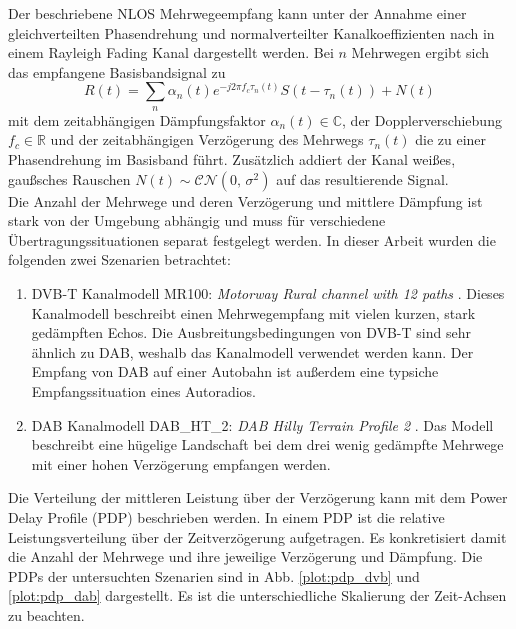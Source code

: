 Der beschriebene NLOS Mehrwegeempfang kann unter der Annahme einer gleichverteilten Phasendrehung und normalverteilter Kanalkoeffizienten nach \cite{proakis} in einem Rayleigh Fading Kanal dargestellt werden.
Bei $n$ Mehrwegen ergibt sich das empfangene Basisbandsignal zu
\begin{equation}
R(t) = \sum \limits_n \alpha_n(t) e^{-j2\pi f_c \tau_n(t)} S(t-\tau_n(t)) + N(t)
\end{equation}
mit dem zeitabhängigen Dämpfungsfaktor $\alpha_n(t) \in \mathbb{C}$, der Dopplerverschiebung $f_c \in \mathbb{R}$ und der zeitabhängigen Verzögerung des Mehrwegs $\tau_n(t)$ die zu einer Phasendrehung im Basisband führt. Zusätzlich addiert der Kanal weißes, gaußsches Rauschen $N(t) \sim \mathcal{C}\mathcal{N}(0,\,\sigma^{2})$ auf das resultierende Signal.\\  
Die Anzahl der Mehrwege und deren Verzögerung und mittlere Dämpfung ist stark von der Umgebung abhängig und muss für verschiedene Übertragungssituationen separat festgelegt werden.
In dieser Arbeit wurden die folgenden zwei Szenarien betrachtet:
\begin{enumerate}
\item DVB-T Kanalmodell MR100: \textit{Motorway Rural channel with 12 paths} \cite{kanalmodell:dvb_paper} \cite{etsi:dvb}. Dieses Kanalmodell beschreibt einen Mehrwegempfang mit vielen kurzen, stark gedämpften Echos. Die Ausbreitungsbedingungen von DVB-T sind sehr ähnlich zu DAB, weshalb das Kanalmodell verwendet werden kann. Der Empfang von DAB auf einer Autobahn ist außerdem eine typsiche Empfangssituation eines Autoradios.
\item DAB Kanalmodell DAB\_HT\_2: \textit{DAB Hilly Terrain Profile 2} \cite{kanalmodell:dab_ht_2}. Das Modell beschreibt eine hügelige Landschaft bei dem drei wenig gedämpfte Mehrwege mit einer hohen Verzögerung empfangen werden.
\end{enumerate}
Die Verteilung der mittleren Leistung über der Verzögerung kann mit dem Power Delay Profile (PDP) beschrieben werden. In einem PDP ist die relative Leistungsverteilung über der Zeitverzögerung aufgetragen. Es konkretisiert damit die Anzahl der Mehrwege und ihre jeweilige Verzögerung und Dämpfung. Die PDPs der untersuchten Szenarien sind in Abb. \ref{plot:pdp_dvb} und \ref{plot:pdp_dab} dargestellt. Es ist die unterschiedliche Skalierung der Zeit-Achsen zu beachten.

